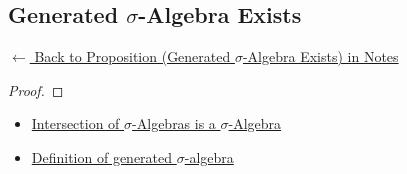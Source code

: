 
\subsection*{Generated $\sigma$-Algebra Exists}
\label{prf:generated-sigma-exists}

\begin{remark*}[Return]
\hyperref[prop:generated-sigma-exists]{$\leftarrow$ Back to Proposition (Generated $\sigma$-Algebra Exists) in Notes}
\end{remark*}

\begin{proof}
\end{proof}

\begin{remark*}

\end{remark*}

\begin{remark*}[Dependencies]
\begin{itemize}
  \item \hyperref[prop:intersection-sigma-algebras]{Intersection of $\sigma$-Algebras is a $\sigma$-Algebra}
  \item \hyperref[def:generated-sigma-algebra]{Definition of generated $\sigma$-algebra}
\end{itemize}

\end{remark*}
